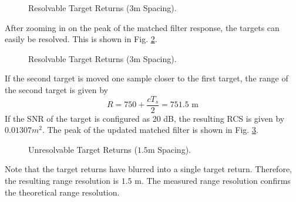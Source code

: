 \documentclass[conference]{IEEEtran}
\begin{document}
\begin{figure}[H]
\centerline{}
\caption{Resolvable Target Returns ($3$m Spacing).}
\label{resolvable_full}
\end{figure}
\noindent
After zooming in on the peak of the matched filter response, the targets can easily be resolved. This is shown in Fig. \ref{resolvable_peak}.
\begin{figure}[H]
\centerline{}
\caption{Resolvable Target Returns ($3$m Spacing).}
\label{resolvable_peak}
\end{figure}
\par
If the second target is moved one sample closer to the first target, the range of the second target is given by 
\begin{equation}
R = 750 + \frac{cT_s}{2} = 751.5 \text{ m}
\end{equation}
If the SNR of the target is configured as 20 dB, the resulting RCS is given by $0.01307m^2$. The peak of the updated matched filter is shown in Fig. \ref{unresolvable_peak}.
\begin{figure}[H]
\centerline{}
\caption{Unresolvable Target Returns ($1.5$m Spacing).}
\label{unresolvable_peak}
\end{figure}
\par
Note that the target returns have blurred into a single target return. Therefore, the resulting range resolution is $1.5 \text{ m}$. The measured range resolution confirms the theoretical range resolution.
\end{document}
